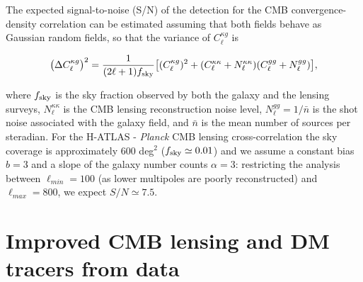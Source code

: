%
%
%
%
The expected signal-to-noise (S/N) of the detection for the CMB convergence-density correlation can be estimated assuming that both fields behave as Gaussian random fields, so that the variance of $C_{\ell}^{\kappa g}$ is

\begin{equation}
\label{eqn:delta_kg}
\bigl(\Delta C_{\ell}^{\kappa g}\bigr)^2 = \frac{1}{(2\ell+1)f_{\rm{sky}}} \bigl[(C_{\ell}^{\kappa g})^2 + (C_{\ell}^{\kappa\kappa}+N_{\ell}^{\kappa\kappa})(C_{\ell}^{gg}+N_{\ell}^{gg})\bigr],
\end{equation}

where $f_{\rm{sky}}$ is the sky fraction observed by both the galaxy and the lensing surveys, $N_{\ell}^{\kappa\kappa}$ is the CMB lensing reconstruction noise level, $N_{\ell}^{gg}=1/\bar{n}$ is the shot noise associated with the galaxy field, and $\bar{n}$ is the mean number of sources per steradian. For the H-ATLAS - \emph{Planck} CMB lensing cross-correlation the sky coverage is approximately 600 deg$^2$ ($f_{\rm{sky}}\simeq 0.01$) and we assume a constant bias $b=3$ and a slope of the galaxy number counts $\alpha=3$: restricting the analysis between $\ell_{min}=100$ (as lower multipoles are poorly reconstructed) and $\ell_{max}=800$, we expect $S/N \simeq 7.5$.



\section{Improved CMB lensing and DM tracers from data}
\label{sec:data}
